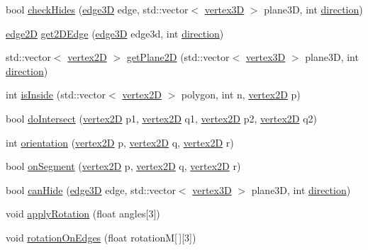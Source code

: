 \begin{DoxyCompactItemize}
\item 
bool \mbox{\hyperlink{class_two_d_obj_acd188f5b49cd1d8c21fde2d8646294fe}{check\+Hides}} (\mbox{\hyperlink{structedge3_d}{edge3D}} edge, std\+::vector$<$ \mbox{\hyperlink{structvertex3_d}{vertex3D}} $>$ plane3D, int \mbox{\hyperlink{structdirection}{direction}})
\item 
\mbox{\hyperlink{structedge2_d}{edge2D}} \mbox{\hyperlink{class_two_d_obj_a1cd226f2becc270af54e16265f9b3b55}{get2\+D\+Edge}} (\mbox{\hyperlink{structedge3_d}{edge3D}} edge3d, int \mbox{\hyperlink{structdirection}{direction}})
\item 
std\+::vector$<$ \mbox{\hyperlink{structvertex2_d}{vertex2D}} $>$ \mbox{\hyperlink{class_two_d_obj_a265505612ca1a250f29052cb303d7762}{get\+Plane2D}} (std\+::vector$<$ \mbox{\hyperlink{structvertex3_d}{vertex3D}} $>$ plane3D, int \mbox{\hyperlink{structdirection}{direction}})
\item 
int \mbox{\hyperlink{class_two_d_obj_a331a606153d723b8290bd885475bb1b5}{is\+Inside}} (std\+::vector$<$ \mbox{\hyperlink{structvertex2_d}{vertex2D}} $>$ polygon, int n, \mbox{\hyperlink{structvertex2_d}{vertex2D}} p)
\item 
bool \mbox{\hyperlink{class_two_d_obj_a86158be2b2314a79b2eaa262c28738d5}{do\+Intersect}} (\mbox{\hyperlink{structvertex2_d}{vertex2D}} p1, \mbox{\hyperlink{structvertex2_d}{vertex2D}} q1, \mbox{\hyperlink{structvertex2_d}{vertex2D}} p2, \mbox{\hyperlink{structvertex2_d}{vertex2D}} q2)
\item 
int \mbox{\hyperlink{class_two_d_obj_a68ccca268283f878cfa12c73365471a3}{orientation}} (\mbox{\hyperlink{structvertex2_d}{vertex2D}} p, \mbox{\hyperlink{structvertex2_d}{vertex2D}} q, \mbox{\hyperlink{structvertex2_d}{vertex2D}} r)
\item 
bool \mbox{\hyperlink{class_two_d_obj_a17f849373d477c1d46dfc917fe70c75b}{on\+Segment}} (\mbox{\hyperlink{structvertex2_d}{vertex2D}} p, \mbox{\hyperlink{structvertex2_d}{vertex2D}} q, \mbox{\hyperlink{structvertex2_d}{vertex2D}} r)
\item 
bool \mbox{\hyperlink{class_two_d_obj_afddeaea49f6d8bc76473a9fa48ff37ef}{can\+Hide}} (\mbox{\hyperlink{structedge3_d}{edge3D}} edge, std\+::vector$<$ \mbox{\hyperlink{structvertex3_d}{vertex3D}} $>$ plane3D, int \mbox{\hyperlink{structdirection}{direction}})
\item 
void \mbox{\hyperlink{class_two_d_obj_a4d364edb11e97ddaf8eb9c61666eb486}{apply\+Rotation}} (float angles\mbox{[}3\mbox{]})
\item 
void \mbox{\hyperlink{class_two_d_obj_abbcac0fcfbc8605a16300eb79282ce4f}{rotation\+On\+Edges}} (float rotationM\mbox{[}$\,$\mbox{]}\mbox{[}3\mbox{]})

\end{DoxyCompactItemize}
